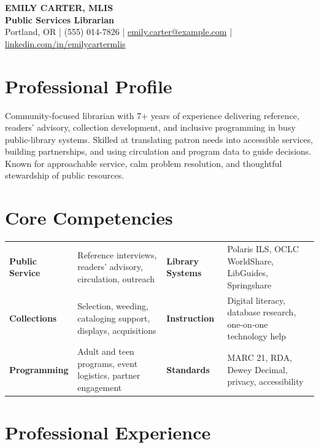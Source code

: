 \documentclass[10pt,letterpaper]{article}
\begin{document}
\color{ink}

\begin{center}
  {\fontsize{24}{26}\selectfont\bfseries\color{forest} EMILY CARTER, MLIS}\\[2pt]
  {\large\bfseries Public Services Librarian}\\[4pt]
  {\small
    Portland, OR \enspace\textcolor{rulecolor}{|}\enspace
    (555) 014-7826 \enspace\textcolor{rulecolor}{|}\enspace
    \href{mailto:emily.carter@example.com}{emily.carter@example.com} \enspace\textcolor{rulecolor}{|}\enspace
    \href{https://www.linkedin.com/in/emilycartermlis}{linkedin.com/in/emilycartermlis}
  }
\end{center}
\vspace{-2pt}

\section*{Professional Profile}
Community-focused librarian with 7+ years of experience delivering reference, readers' advisory, collection development, and inclusive programming in busy public-library systems. Skilled at translating patron needs into accessible services, building partnerships, and using circulation and program data to guide decisions. Known for approachable service, calm problem resolution, and thoughtful stewardship of public resources.

\section*{Core Competencies}
\begin{tabularx}{\textwidth}{@{}>{\bfseries}l X >{\bfseries}l X@{}}
  Public Service & Reference interviews, readers' advisory, circulation, outreach &
  Library Systems & Polaris ILS, OCLC WorldShare, LibGuides, Springshare \\
  Collections & Selection, weeding, cataloging support, displays, acquisitions &
  Instruction & Digital literacy, database research, one-on-one technology help \\
  Programming & Adult and teen programs, event logistics, partner engagement &
  Standards & MARC 21, RDA, Dewey Decimal, privacy, accessibility \\
\end{tabularx}

\section*{Professional Experience}
\end{document}
